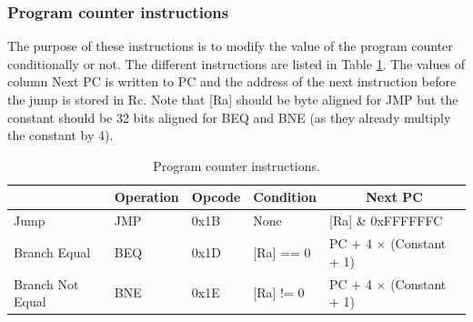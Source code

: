 \subsubsection*{Program counter instructions}

The purpose of these instructions is to modify the value of the program counter conditionally or 
not. The different instructions are listed in Table \ref{tab:instruction/pc}. The values of 
column Next PC is written to PC and the address of the next instruction before the jump is
stored in Rc. Note that [Ra] should be byte aligned for JMP but the constant should be 32 bits 
aligned for BEQ and BNE (as they already multiply the constant by 4).

\begin{table}[H]
    \centering
    \begin{tabular}{|l|l|l|l|l|}
    \hline
    \rowcolor[HTML]{DAE8FC} 
    \multicolumn{1}{|c|}{\cellcolor[HTML]{DAE8FC}\textbf{Name}} & \multicolumn{1}{c|}{\cellcolor[HTML]{DAE8FC}\textbf{Operation}} & \multicolumn{1}{c|}{\cellcolor[HTML]{DAE8FC}\textbf{Opcode}} & \multicolumn{1}{c|}{\cellcolor[HTML]{DAE8FC}\textbf{Condition}} & \multicolumn{1}{c|}{\cellcolor[HTML]{DAE8FC}\textbf{Next PC}} \\ \hline
    Jump                                                        & JMP                                                             & 0x1B                                                         & None                                                                 & {[}Ra{]} \& 0xFFFFFFC                                         \\ \hline
    Branch Equal                                                & BEQ                                                             & 0x1D                                                         & {[}Ra{]} == 0                                                        & PC + 4 $\times$ (Constant + 1)             \\ \hline
    Branch Not Equal                                            & BNE                                                             & 0x1E                                                         & {[}Ra{]} != 0                                                        & PC + 4 $\times$ (Constant + 1)                \\ \hline
    \end{tabular}
    \caption{Program counter instructions.}
    \label{tab:instruction/pc}
\end{table}

